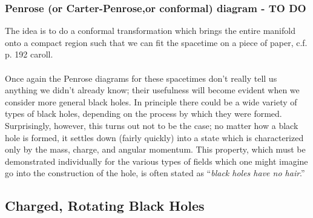 \subsubsection{Penrose (or Carter-Penrose,or conformal) diagram  - TO DO}
The idea is to do a conformal transformation which brings the entire
manifold onto a compact region such that we can fit the spacetime on a piece of paper, c.f. p. 192 caroll.\\
\\
Once again the Penrose diagrams for these spacetimes don’t really tell us anything we
didn’t already know; their usefulness will become evident when we consider more general
black holes. In principle there could be a wide variety of types of black holes, depending on
the process by which they were formed. Surprisingly, however, this turns out not to be the
case; no matter how a black hole is formed, it settles down (fairly quickly) into a state which
is characterized only by the mass, charge, and angular momentum. This property, which
must be demonstrated individually for the various types of fields which one might imagine
go into the construction of the hole, is often stated as “\emph{black holes have no hair}.”
\newpage

\subsection{Charged, Rotating Black Holes}
